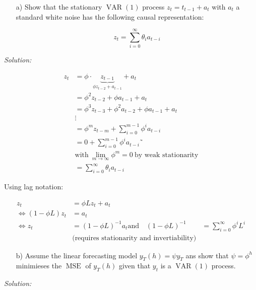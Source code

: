 \documentclass[12pt,a4paper]{article}
\newcommand{\MSE}{\operatorname{MSE}} %
\newcommand{\VAR}{\operatorname{VAR}} %
\begin{document}
\begin{itemize}
  \item[a)] Show that the stationary $\VAR(1)$ process $z_t = t_{t-1} + a_t$ with $a_t$ a standard white noise has the following causal representation:
  
  $$z_t = \sum_{i  = 0}^{\infty} \theta_i a_{t-i} $$
\end{itemize}

\emph{Solution:}

\begin{align*}
  z_t & = \phi \cdot \underbrace{z_{t-1}}_{\phi z_{t-2} + a_{t-1}} + a_t \\
  & = \phi^2 z_{t-2} + \phi a_{t-1} + a_t\\
  & = \phi^3 z_{t-3} + \phi^2 a_{t-2} + \phi a_{t-1} + a_t\\
  & \vdots \\
  & = \phi^m z_{t -m} + \sum_{i = 0}^{m - 1} \phi^i a_{t-i}\\
  & = 0 + \sum_{i = 0}^{m - 1} \phi^i a_{t-i}˜ \\
  & \text{with} \ \lim_{m \rightarrow \infty} \phi^m = 0 \ \text{by weak stationarity}\\
  & = \sum_{i = 0}^{\infty} \theta_i a_{t-i}
\end{align*}

Using lag notation:

\begin{align*}
  z_t & = \phi  L z_t + a_t \\
  \Leftrightarrow (1 - \phi L)z_t & = a_t \\
  \Leftrightarrow z_t & = (1 - \phi L)^{-1} a_t
  \text{and} \quad (1 - \phi L)^{-1} & = \sum_{i = 0}^{\infty} \phi^i L^i \\
  & \text{(requires stationarity and invertiability)}
\end{align*}

\begin{itemize}
  \item[b)] Assume the linear forecasting model $y_T (h) = \psi y_T$ ans show that $\psi = \phi^h$ minimieses the $\MSE$ of $y_T (h)$  given that $y_t$ is a $\VAR(1)$ process. 
\end{itemize}

\emph{Solution:}
\end{document}
